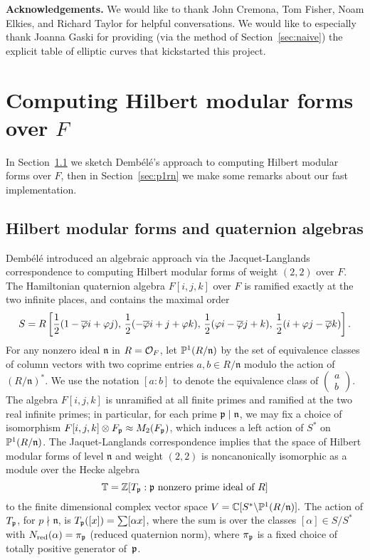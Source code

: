 \documentclass{amsart}
\newcommand{\n}{\mathfrak{n}}
\newcommand{\dembele}{Demb\'el{\'e}\xspace}
\begin{document}
{\bf Acknowledgements.} We would like to thank John Cremona, Tom
Fisher, Noam Elkies, and Richard Taylor for helpful conversations.  We
would like to especially thank Joanna Gaski for providing (via the
method of Section~\ref{sec:naive}) the explicit table of elliptic
curves that kickstarted this project.

\section{Computing Hilbert modular forms over $F$}\label{sec:hmf}

In Section~\ref{sec:dembele} we sketch \dembele's approach to computing Hilbert
modular forms over $F$, then in Section~\ref{sec:p1rn} we make
some remarks about our fast implementation. 

\subsection{Hilbert modular forms and quaternion 
algebras}\label{sec:dembele}
\dembele \cite{dembele:hilbert5} introduced an algebraic approach via
the Jacquet-Langlands correspondence to computing Hilbert modular
forms of weight $(2,2)$ over $F$.  The Hamiltonian quaternion algebra
$F[i,j,k]$ over $F$ is ramified exactly at the two infinite places,
and contains the maximal order
$$
 S = R\left[\frac{1}{2}(1-\overline{\varphi} i + \varphi j),\,
       \frac{1}{2}(-\overline{\varphi} i + j + \varphi k),\,
       \frac{1}{2}(\varphi i - \overline{\varphi} j + k), \,
       \frac{1}{2}(i + \varphi j - \overline{\varphi} k)\right].
$$
For any nonzero ideal $\n$ in $R=\mathcal{O}_F$,
let $\P^1(R/\n)$ by the set of equivalence classes of
 column vectors with two coprime entries $a,b \in R/\n$ modulo the
 action of $(R/\n)^*$.  We use the notation $[a:b]$
to denote the equivalence class of 
$\left(\begin{smallmatrix}a\\b\end{smallmatrix}\right)$.
The algebra $F[i,j,k]$ is unramified at all finite primes and ramified
at the two real infinite primes; in
particular, for each prime $\p\mid \n$, we may fix a choice of isomorphism
$F[i,j,k]\otimes F_{\mathfrak{p}} \approx M_2(F_{\mathfrak{p}})$, which induces a left
action of $S^*$ on $\P^1(R/\n)$. The Jaquet-Langlands correspondence implies that
the space of Hilbert modular forms of level $\n$ and weight $(2,2)$ is
noncanonically isomorphic as a module over the Hecke algebra
$$\mathbb{T}=\mathbb{Z}[T_{\mathfrak{p}} :  \mathfrak{p} \text{ nonzero prime ideal of }R]$$ 
to the finite dimensional complex vector space $ V = \C[S^* \backslash
\P^1(R/\n)].  $ The action of $T_{\mathfrak{p}}$, for $p\nmid \n$, is
$T_{\mathfrak{p}}([x]) = \sum [\alpha x]$, where the sum is over the classes
$[\alpha]\in S/S^*$ with $N_{\text{red}}(\alpha)=\pi_{\mathfrak{p}}$ (reduced quaternion norm),
where $\pi_{\mathfrak{p}}$ is a fixed choice of totally positive generator of~$\mathfrak{p}$.
\end{document}
